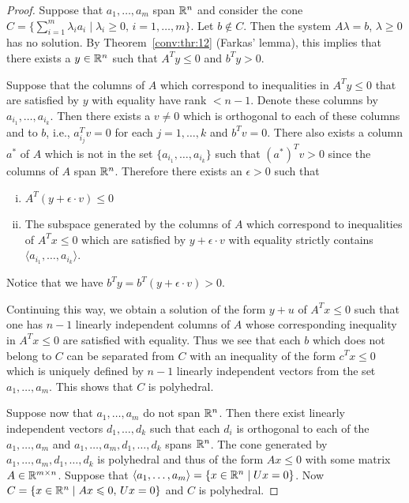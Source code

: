 \begin{proof}
  Suppose that $a_1,\ldots,a_m$ span $\mathbb{R}^n$ and consider the cone $C = \{
  \sum_{i=1}^m \lambda_i a_i \mid \lambda_i\geq0, \, i=1,\ldots,m\}$.
  Let $b \notin C$.
  Then the system $A\lambda = b$, $\lambda \geq 0$ has no solution.
  By Theorem~\ref{conv:thr:12} (Farkas' lemma), this implies that there exists a $y\in\mathbb{R}^n$
  such that $A^Ty \leq 0$ and $b^Ty > 0$.

  Suppose that the columns of $A$ which correspond to
  inequalities in $A^Ty\leq0$   that are satisfied  by $y$ with equality
  have rank $<n-1$.
  Denote these columns by $a_{i_1},\ldots,a_{i_k}$.  
  Then there exists a $v\neq0$ which is orthogonal to
  each of these columns and to $b$, i.e., $a_{i_j}^Tv = 0$ for each
  $j=1,\ldots,k$ and $b^Tv =0 $. 
  There also exists a column $a^*$ of $A$ which is not in the set
  $\{a_{i_1},\ldots,a_{i_k}\}$ such that $(a^*)^Tv>0$ since the columns of
  $A$ span $\mathbb{R}^n$. Therefore there exists an $\epsilon>0$ such that 
  \begin{enumerate}[i)]
  \item $A^T(y + \epsilon \cdot v)\leq0$ 
  \item The subspace generated by the columns of $A$ which correspond
    to inequalities of $A^Tx\leq0$ which are satisfied by $y + \epsilon \cdot v$
    with equality strictly contains $\langle a_{i_1},\ldots,a_{i_k}\rangle$. 
  \end{enumerate}
  
  Notice that we have $b^Ty = b^T(y + \epsilon \cdot v)>0$. 

  Continuing this way, we obtain a solution of the form $y + u$ of
  $A^Tx\leq0$ such that one has $n-1$ linearly independent columns of $A$
  whose corresponding inequality in $A^Tx\leq0$ are satisfied with
  equality.   Thus we see that each $b$ which does
  not belong to $C$ can be separated from $C$ with an inequality of
  the form $c^Tx\leq0$  which
  is uniquely defined by $n-1$ linearly independent vectors from the set
  $a_1,\ldots,a_m$.  This shows that $C$ is polyhedral. 

  Suppose now that $a_1,\ldots,a_m$ do not span $\mathbb{R}^n$. Then there  exist
  linearly independent vectors $d_1,\ldots,d_k$ such that each $d_i$ is
  orthogonal to each of the $a_1,\ldots,a_m$ and $a_1,\ldots,a_m,d_1,\ldots,d_k$
  spans $\mathbb{R}^n$.   The cone generated by
  $a_1,\ldots,a_m,d_1,\ldots,d_k$ is polyhedral and thus of the form $Ax\leq0$
  with some matrix $A\in \mathbb{R}^{m\times n}$. Suppose that  $\langle a_1,\ldots,a_m\rangle = \{x
  \in \mathbb{R}^n \mid Ux = 0\}$.  Now $C = \{ x \in \mathbb{R}^n \mid Ax\leqslant0, \, Ux = 0\}$
  and $C$ is polyhedral. 



\end{proof}
